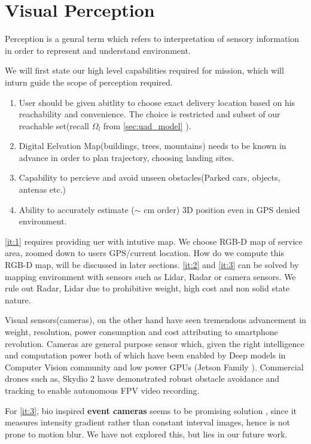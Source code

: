 \section{Visual Perception}

Perception is a genral term which refers to interpretation of sensory information in order to represent and understand environment.

We will first state our high level capabilities required for mission, which will inturn guide the scope of perception required.

\begin{enumerate}
    \item \label{it:1} User should be given abitlity to choose exact delivery location based on his reachability and convenience. The choice is restricted and subset of our reachable set(recall $\Omega_l$ from \ref{sec:uad_model} ).
    \item \label{it:2} Digital Eelvation Map(buildings, trees, mountains) needs to be known in advance in order to plan trajectory, choosing landing sites.
    \item \label{it:3} Capability to percieve and avoid unseen obstacles(Parked cars, objects, antenas etc.)
    \item \label{it:4} Ability to accurately estimate ($\sim$ cm order) 3D position even in GPS denied environment.
\end{enumerate}

\ref{it:1} requires providing uer with intutive map. We choose RGB-D map of service area, zoomed down to users GPS/current location. How do we compute this RGB-D map, will be discussed in later sections. \ref{it:2} and \ref{it:3} can be solved by mapping environment with sensors such as Lidar, Radar or camera sensors. We rule out Radar, Lidar due to prohibitive weight, high cost and non solid state nature.

Visual sensors(cameras), on the other hand have seen tremendous advancement in weight, resolution, power consumption and cost attributing to smartphone revolution. Cameras are general purpose sensor which, given the right intelligence and computation power both of which have been enabled by Deep models in Computer Vision community and low power GPUs (Jetson Family \cite{nvidiatx2:online}). Commercial drones such as, Skydio 2 \cite{Skydio2T67:online} have demonstrated robust obstacle avoidance and tracking to enable autonomous FPV video recording.

For \ref{it:3}, bio inspired \textbf{event cameras} seems to be promising solution \cite{event_avoid:online} \cite{falanga2019fast}, since it measures intensity gradient rather than constant interval images, hence is not prone to motion blur. We have not explored this, but lies in our future work.

